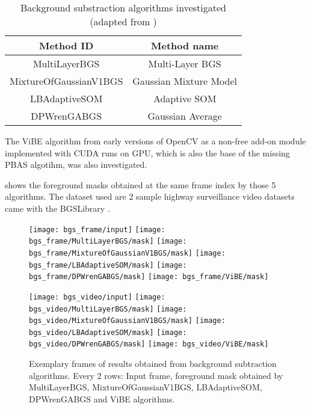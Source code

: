 \begin{table}[H]
  \centering
  \begin{tabular}{cc}
  \toprule
  \textbf{Method ID} & \textbf{Method name}\\
  \midrule
  MultiLayerBGS & Multi-Layer BGS \\
  MixtureOfGaussianV1BGS & Gaussian Mixture Model \\
  LBAdaptiveSOM & Adaptive SOM \\
  DPWrenGABGS & Gaussian Average \\
  \bottomrule
  \end{tabular}
  \caption{Background substraction algorithms investigated (adapted from \cite{bgslibrary})}
  \label{Table:bgs}
\end{table}


The ViBE algorithm from early versions of OpenCV as a non-free add-on module implemented with CUDA runs on GPU, which is also the base of the missing PBAS algotihm, was also investigated.

 shows the foreground masks obtained at the same frame index by those 5 algorithms. The dataset used are 2 sample highway surveillance video datasets came with the BGSLibrary \cite{bgslibrary}.

\begin{figure}[htb]
  \centering
  \texttt{[image: bgs\_frame/input]}
  \texttt{[image: bgs\_frame/MultiLayerBGS/mask]}
  \texttt{[image: bgs\_frame/MixtureOfGaussianV1BGS/mask]}
  \texttt{[image: bgs\_frame/LBAdaptiveSOM/mask]}
  \texttt{[image: bgs\_frame/DPWrenGABGS/mask]}
  \texttt{[image: bgs\_frame/ViBE/mask]}


  \texttt{[image: bgs\_video/input]}
  \texttt{[image: bgs\_video/MultiLayerBGS/mask]}
  \texttt{[image: bgs\_video/MixtureOfGaussianV1BGS/mask]}
  \texttt{[image: bgs\_video/LBAdaptiveSOM/mask]}
  \texttt{[image: bgs\_video/DPWrenGABGS/mask]}
  \texttt{[image: bgs\_video/ViBE/mask]}

  \caption{Exemplary frames of results obtained from background subtraction algorithms. Every 2 rows: Input frame, foreground mask obtained by MultiLayerBGS, MixtureOfGaussianV1BGS, LBAdaptiveSOM, DPWrenGABGS and ViBE algorithms.}
  \label{Figure:bgs_frame}
\end{figure}


